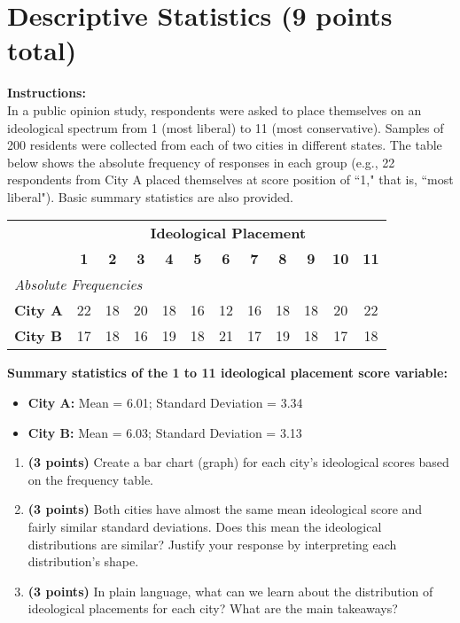 \documentclass{article}
\newcommand{\blankbox}[2][3cm]{%
    \vspace{-0.5em}
    \begin{figure}[H]
        \makebox[\linewidth]{%
            \begin{tcolorbox}[
                colback=white,
                colframe=white,  %
                width=#2, %
                height=#1,
                boxrule=0.2mm
            ]
            \end{tcolorbox}
        }
    \end{figure}
    \vspace{-2em}
}
\begin{document}
\newpage
\section{Descriptive Statistics (9 points total)}
\noindent\textbf{Instructions:} \\
In a public opinion study, respondents were asked to place themselves on an ideological spectrum from 1 (most liberal) to 11 (most conservative). Samples of 200 residents were collected from each of two cities in different states. The table below shows the absolute frequency of responses in each group (e.g., 22 respondents from City A placed themselves at score position of ``1," that is, ``most liberal"). Basic summary statistics are also provided.

\begin{center}
\begin{tabular}{lccccccccccc}
\hline
& \multicolumn{11}{c}{\textbf{Ideological Placement}} \\ \cline{2-12}
& \textbf{1} & \textbf{2} & \textbf{3} & \textbf{4} & \textbf{5} & \textbf{6} & \textbf{7} & \textbf{8} & \textbf{9} & \textbf{10} & \textbf{11} \\
\hline
\multicolumn{12}{l}{\textit{Absolute Frequencies}} \\
\textbf{City A} & 22 & 18 & 20 & 18 & 16 & 12 & 16 & 18 & 18 & 20 & 22 \\
\textbf{City B} & 17 & 18 & 16 & 19 & 18 & 21 & 17 & 19 & 18 & 17 & 18 \\
\hline
\end{tabular}
\end{center}

\textbf{Summary statistics of the 1 to 11 ideological placement score variable:}

\begin{itemize}
\item \textbf{City A:} Mean = 6.01; Standard Deviation = 3.34
\item \textbf{City B:} Mean = 6.03; Standard Deviation = 3.13
\end{itemize}

\begin{enumerate}
\item \textbf{(3 points)} Create a bar chart (graph) for each city's ideological scores based on the frequency table. \blankbox[6cm]{1.0\linewidth} %

\item \textbf{(3 points)} Both cities have almost the same mean ideological score and fairly similar standard deviations. Does this mean the ideological distributions are similar? Justify your response by interpreting each distribution's shape. \blankbox[4.75cm]{1.0\linewidth}

\item \textbf{(3 points)} In plain language, what can we learn about the distribution of ideological placements for each city? What are the main takeaways? %
\end{enumerate}
\end{document}
